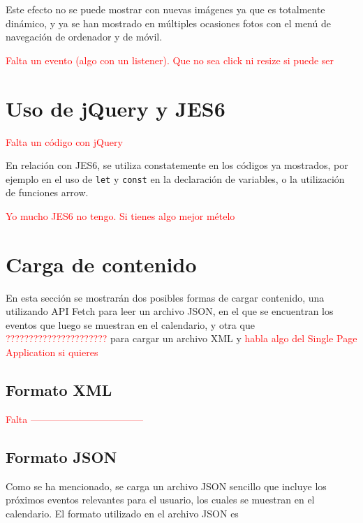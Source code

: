 \documentclass[11pt, a4paper]{book}
\begin{document}
	Este efecto no se puede mostrar con nuevas imágenes ya que es totalmente dinámico, y ya se han mostrado en múltiples ocasiones fotos con el menú de navegación de ordenador y de móvil.
	
	\begin{Huge}
		\textcolor{red}{Falta un evento (algo con un listener). Que no sea click ni resize si puede ser}
	\end{Huge}
	
	\section{Uso de jQuery y JES6}
	\begin{Huge}
		\textcolor{red}{Falta un código con jQuery}
	\end{Huge}

	En relación con JES6, se utiliza constatemente en los códigos ya mostrados, por ejemplo en el uso de \texttt{let} y \texttt{const} en la declaración de variables, o la utilización de funciones arrow.
	\begin{Huge}
		\textcolor{red}{Yo mucho JES6 no tengo. Si tienes algo mejor mételo}
	\end{Huge}
	
	\section{Carga de contenido}
	En esta sección se mostrarán dos posibles formas de cargar contenido, una utilizando API Fetch para leer un archivo JSON, en el que se encuentran los eventos que luego se muestran en el calendario, y otra que \textcolor{red}{??????????????????????} para cargar un archivo XML y \textcolor{red}{habla algo del Single Page Application si quieres}
	\subsection{Formato XML}
	\begin{Huge}
		\textcolor{red}{Falta -----------------------------------}
	\end{Huge}

	\subsection{Formato JSON}
	Como se ha mencionado, se carga un archivo JSON sencillo que incluye los próximos eventos relevantes para el usuario, los cuales se muestran en el calendario. El formato utilizado en el archivo JSON es
	
\end{document}
